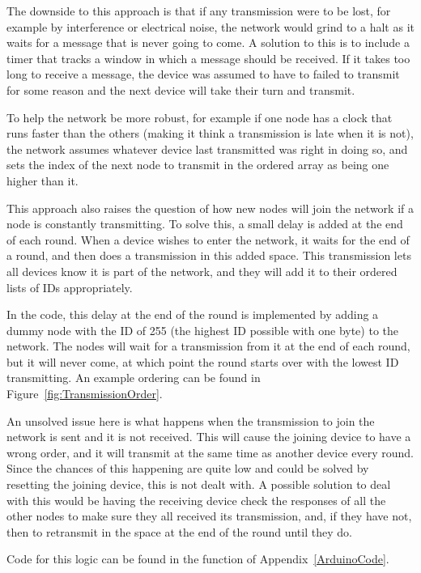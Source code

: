 The downside to this approach is that if any transmission were to be lost, for example by interference or electrical noise, the network would grind to a halt as it waits for a message that is never going to come. A solution to this is to include a timer that tracks a window in which a message should be received. If it takes too long to receive a message, the device was assumed to have to failed to transmit for some reason and the next device will take their turn and transmit.

To help the network be more robust, for example if one node has a clock that runs faster than the others (making it think a transmission is late when it is not), the network assumes whatever device last transmitted was right in doing so, and sets the index of the next node to transmit in the ordered array as being one higher than it.

This approach also raises the question of how new nodes will join the network if a node is constantly transmitting. To solve this, a small delay is added at the end of each round. When a device wishes to enter the network, it waits for the end of a round, and then does a transmission in this added space. This transmission lets all devices know it is part of the network, and they will add it to their ordered lists of IDs appropriately. 

In the code, this delay at the end of the round is implemented by adding a dummy node with the ID of 255 (the highest ID possible with one byte) to the network. The nodes will wait for a transmission from it at the end of each round, but it will never come, at which point the round starts over with the lowest ID transmitting. An example ordering can be found in Figure~\ref{fig:TransmissionOrder}.

An unsolved issue here is what happens when the transmission to join the network is sent and it is not received. This will cause the joining device to have a wrong order, and it will transmit at the same time as another device every round. Since the chances of this happening are quite low and could be solved by resetting the joining device, this is not dealt with. A possible solution to deal with this would be having the receiving device check the responses of all the other nodes to make sure they all received its transmission, and, if they have not, then to retransmit in the space at the end of the round until they do.

Code for this logic can be found in the  function of Appendix~\ref{ArduinoCode}.

